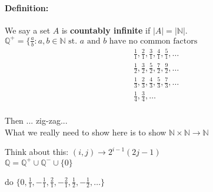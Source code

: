 \documentclass[a4paper, 11pt, twoside]{article}
\begin{document}
\paragraph{Definition:} We say a set $A$ is \textbf{countably infinite} if $|A|=|\mathbb{N}|$.\\

$\mathbb{Q}^+ =\{\frac{a}{b}: a, b \in \mathbb{N} \text{ st. } a \text{ and } b \text { have no common factors}$\\

\[
\begin{split}
	&\frac11, \frac21, \frac31, \frac41, \frac51, \dots\\
	&\frac12, \frac32, \frac52, \frac72, \frac92, \dots\\
	&\frac13, \frac23, \frac43, \frac53, \frac73, \dots\\
	&\frac14, \frac34, \dots\\
\end{split}
\]

Then ... zig-zag...\\

What we really need to show here is to show $\mathbb{N}\times\mathbb{N}\to \mathbb{N}$

Think about this: $(i, j)\to 2^{i-1}(2j-1)$\\

$\mathbb{Q}=\mathbb{Q}^+\cup\mathbb{Q}^-\cup\{0\}$

do $\{0, \frac{1}{1}, -\frac{1}{1}, \frac{2}{1}, -\frac{2}{1}, \frac{1}{2}, -\frac{1}{2}, \dots\}$
\end{document}
